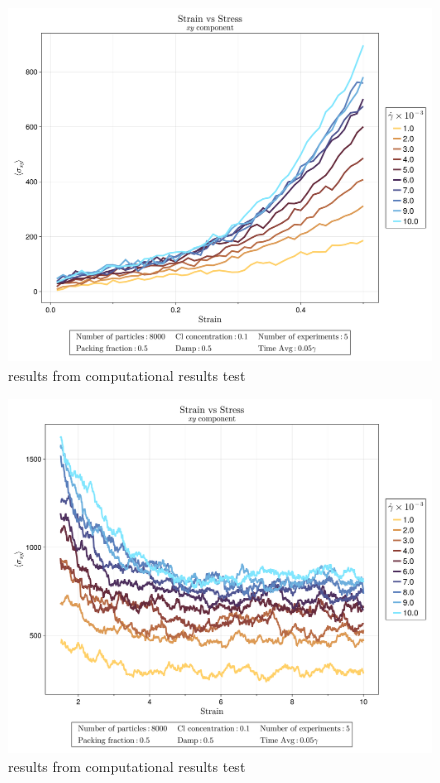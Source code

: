 \begin{figure}[ht!]
    \centering
    \includegraphics[width=\textwidth]{figs/ComputaitonalResults/CL10/ElasticStrainStressXY.png}
    \caption{results from computational results test}
\end{figure}

\begin{figure}[ht!]
    \centering
    \includegraphics[width=\textwidth]{figs/ComputaitonalResults/CL10/ViscoElasticStrainStressXY.png}
    \caption{results from computational results test}
\end{figure}

